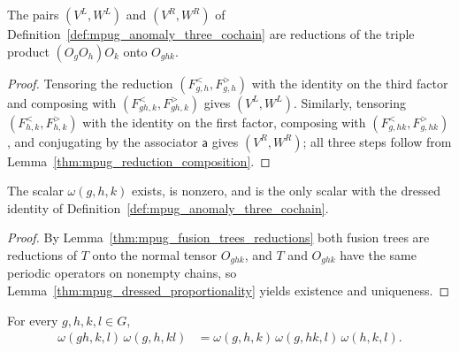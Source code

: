 \begin{lemma}
    \label{thm:mpug_fusion_trees_reductions}
    \leanok
    The pairs $(V^L,W^L)$ and $(V^R,W^R)$ of
    Definition~\ref{def:mpug_anomaly_three_cochain} are reductions of the
    triple product $(O_gO_h)O_k$ onto $O_{ghk}$.
\end{lemma}

\begin{proof}\leanok
    Tensoring the reduction $(F^<_{g,h},F^>_{g,h})$ with the
    identity on the third factor and composing with $(F^<_{gh,k},F^>_{gh,k})$
    gives $(V^L,W^L)$. Similarly, tensoring $(F^<_{h,k},F^>_{h,k})$ with the
    identity on the first factor, composing with $(F^<_{g,hk},F^>_{g,hk})$,
    and conjugating by the associator $\mathsf a$ gives $(V^R,W^R)$; all
    three steps follow from Lemma~\ref{thm:mpug_reduction_composition}.
\end{proof}

\begin{lemma}
    \label{thm:mpug_anomaly_three_cochain_spec}
    \leanok
    The scalar $\omega(g,h,k)$ exists, is nonzero, and is the only scalar
    with the dressed identity of
    Definition~\ref{def:mpug_anomaly_three_cochain}.
\end{lemma}

\begin{proof}\leanok
    By Lemma~\ref{thm:mpug_fusion_trees_reductions} both fusion trees are
    reductions of $T$ onto the normal tensor $O_{ghk}$, and $T$ and
    $O_{ghk}$ have the same periodic operators on nonempty chains, so
    Lemma~\ref{thm:mpug_dressed_proportionality} yields existence and
    uniqueness.
\end{proof}

\begin{theorem}
    \label{thm:mpug_anomaly_three_cocycle}
    \leanok
    For every $g,h,k,l\in G$,
    \begin{align}
        \omega(gh,k,l)\,\omega(g,h,kl)
         & =\omega(g,h,k)\,\omega(g,hk,l)\,\omega(h,k,l).
        \label{eq:mpug_anomaly_three_cocycle}
    \end{align}
\end{theorem}

